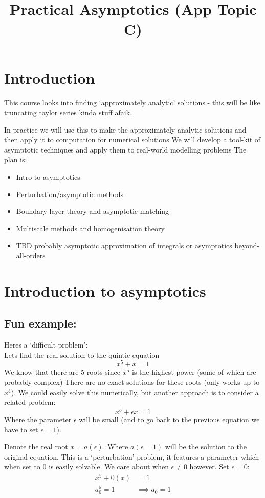 \documentclass{X:/Documents/Coding/Latex/myassignment}
\title{Practical Asymptotics (App Topic C)}
\begin{document}
\maketitle




\section{Introduction}
This course looks into finding `approximately analytic' solutions - this will be like truncating taylor series kinda stuff afaik.

In practice we will use this to make the approximately analytic solutions and then apply it to computation for numerical solutions
We will develop a tool-kit of asymptotic techniques and apply them to real-world modelling problems
The plan is:
\begin{itemize}
    \item Intro to asymptotics
    \item Perturbation/asymptotic methods
    \item Boundary layer theory and asymptotic matching
    \item Multiscale methods and homogenisation theory
    \item TBD probably asymptotic approximation of integrals or asymptotics beyond-all-orders
\end{itemize}

\section{Introduction to asymptotics}
\subsection{Fun example:}
Heres a `difficult problem':\\
Lets find the real solution to the quintic equation
\[x^5 + x =1\]
We know that there are 5 roots since $x^5$ is the highest power (some of which are probably complex)
There are no exact solutions for these roots (only works up to $x^4$).
We could easily solve this numerically, but another approach is to consider a related problem:\\
\[x^5 + \epsilon x = 1\]
Where the parameter $\epsilon$ will be small (and to go back to the previous equation we have to set $\epsilon=1$).

Denote the real root $x=a(\epsilon)$. Where $a(\epsilon=1)$ will be the solution to the original equation.  This is a `perturbation' problem, it features a parameter which when set to $0$ is easily solvable. We care about when $\epsilon\neq 0$ however.
Set $\epsilon=0$:
\begin{align*}
    x^5 + 0(x) &= 1\\
    a_0^5 = 1 &\implies a_0 = 1\\
\end{align*}
\end{document}

